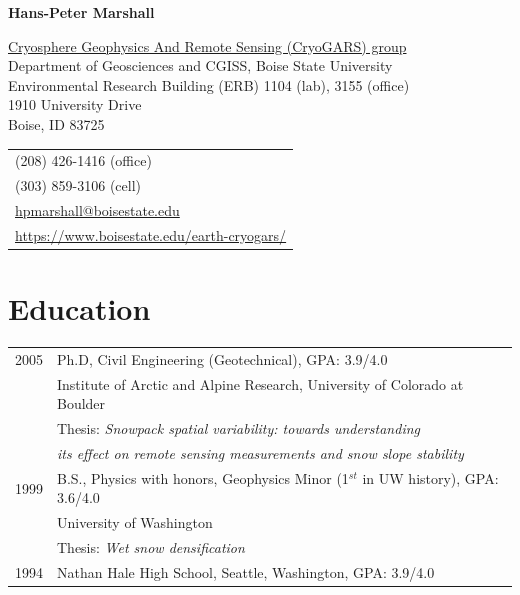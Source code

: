 \documentclass[11pt]{article}
\def\name{Hans-Peter Marshall}
\begin{document}


\centerline{\Large \bf \name}

\vspace{0.25in}

\begin{minipage}{0.70\linewidth}
  \href{http://earth.boisestate.edu/cryogars/}{Cryosphere Geophysics And Remote Sensing (CryoGARS) group} \\
  Department of Geosciences and CGISS, Boise State University \\
  Environmental Research Building (ERB) 1104 (lab), 3155 (office) \\
  1910 University Drive \\
  Boise, ID  83725
\end{minipage}
\begin{minipage}{0.30\linewidth}
  \begin{tabular}{l}
     (208) 426-1416 (office) \\
     (303) 859-3106 (cell) \\
    \href{mailto:hpmarshall@boisestate.edu}{hpmarshall@boisestate.edu} \\
    \href{https://www.boisestate.edu/earth-cryogars/}{https://www.boisestate.edu/earth-cryogars/} \\
  \end{tabular}
\end{minipage}

\section*{Education}

\begin{tabular}{ll}
	2005 & Ph.D, Civil Engineering (Geotechnical), GPA: 3.9/4.0 \\
	          & Institute of Arctic and Alpine Research, University of Colorado at Boulder \\
		 & Thesis: \textit{Snowpack spatial variability: towards understanding} \\
                  &   \textit{its effect on remote sensing measurements and snow slope stability} \\
	1999 &  B.S., Physics with honors, Geophysics Minor (1$^{st}$ in UW history), GPA: 3.6/4.0 \\
	         &   University of Washington \\
	         &  Thesis: \textit{Wet snow densification} \\
       1994  &  Nathan Hale High School, Seattle, Washington, GPA: 3.9/4.0 \\
\end{tabular}
\end{document}
